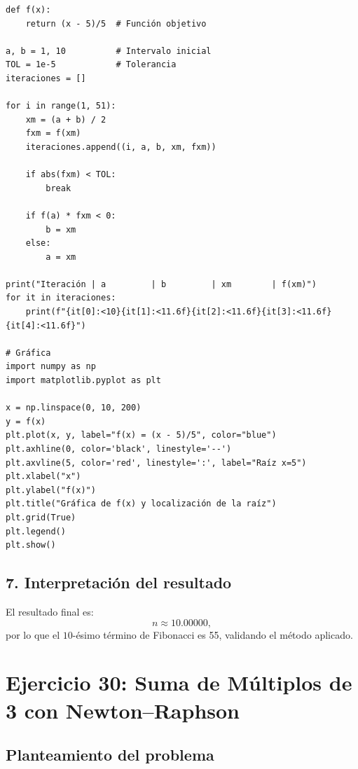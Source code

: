 \documentclass[12pt]{article}
\begin{document}
\begin{tcolorbox}[title=Código Python: Método de Bisección, 
                  colback=white, colframe=black, breakable, enhanced]
\begin{lstlisting}[style=mypython]
def f(x):
    return (x - 5)/5  # Función objetivo

a, b = 1, 10          # Intervalo inicial
TOL = 1e-5            # Tolerancia
iteraciones = []

for i in range(1, 51):
    xm = (a + b) / 2
    fxm = f(xm)
    iteraciones.append((i, a, b, xm, fxm))
    
    if abs(fxm) < TOL:
        break
    
    if f(a) * fxm < 0:
        b = xm
    else:
        a = xm

print("Iteración | a         | b         | xm        | f(xm)")
for it in iteraciones:
    print(f"{it[0]:<10}{it[1]:<11.6f}{it[2]:<11.6f}{it[3]:<11.6f}{it[4]:<11.6f}")

# Gráfica
import numpy as np
import matplotlib.pyplot as plt

x = np.linspace(0, 10, 200)
y = f(x)
plt.plot(x, y, label="f(x) = (x - 5)/5", color="blue")
plt.axhline(0, color='black', linestyle='--')
plt.axvline(5, color='red', linestyle=':', label="Raíz x=5")
plt.xlabel("x")
plt.ylabel("f(x)")
plt.title("Gráfica de f(x) y localización de la raíz")
plt.grid(True)
plt.legend()
plt.show()
\end{lstlisting}
\end{tcolorbox}


\subsection*{7. Interpretación del resultado}
El resultado final es:
\[
n \approx 10.00000,
\]
por lo que el \(10\)-ésimo término de Fibonacci es 55, validando el método aplicado.






\section*{Ejercicio 30: Suma de Múltiplos de 3 con Newton–Raphson}

\subsection*{Planteamiento del problema}
\end{document}
